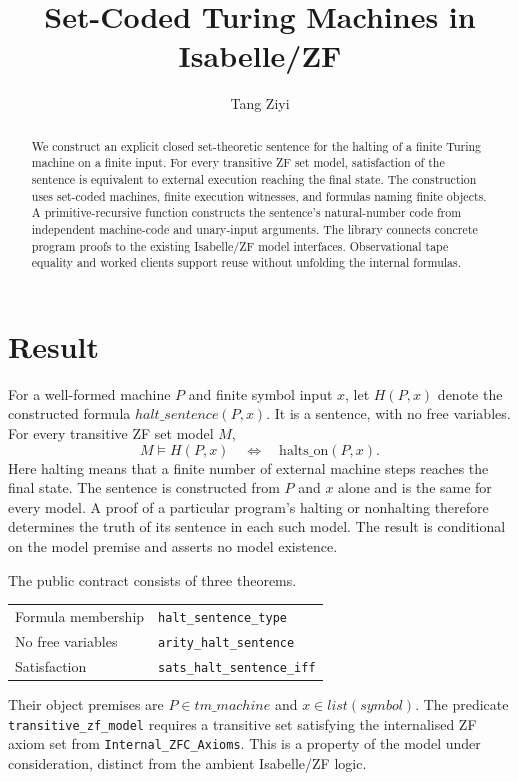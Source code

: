 \documentclass[11pt,a4paper]{article}
\newcommand{\theoremname}[1]{{\urlstyle{tt}\nolinkurl{#1}}}
\begin{document}
\title{Set-Coded Turing Machines in Isabelle/ZF}
\author{Tang Ziyi}
\maketitle

\begin{abstract}
We construct an explicit closed set-theoretic sentence for the halting of
a finite Turing machine on a finite input. For every transitive ZF set
model, satisfaction of the sentence is equivalent to external execution
reaching the final state. The construction uses set-coded machines,
finite execution witnesses, and formulas naming finite objects.
A primitive-recursive function constructs the sentence's natural-number
code from independent machine-code and unary-input arguments.
The library connects concrete program proofs to the existing Isabelle/ZF
model interfaces. Observational tape equality and worked clients support
reuse without unfolding the internal formulas.
\end{abstract}

\tableofcontents
\clearpage
{}

\section{Result}
For a well-formed machine $P$ and finite symbol input $x$, let
$H(P,x)$ denote the constructed formula
$\mathit{halt\_sentence}(P,x)$. It is a sentence, with no free variables.
For every transitive ZF set model $M$,
\[
  M\models H(P,x)
  \quad\Longleftrightarrow\quad
  \mathrm{halts\_on}(P,x).
\]
Here halting means that a finite number of external machine steps
reaches the final state. The sentence is constructed from $P$ and $x$
alone and is the same for every model. A proof of a particular program's
halting or nonhalting therefore determines the truth of its sentence in
each such model. The result is conditional on the model premise and
asserts no model existence.

The public contract consists of three theorems.
\begin{center}
\begin{tabular}{@{}ll@{}}
Formula membership & \theoremname{halt_sentence_type} \\
No free variables & \theoremname{arity_halt_sentence} \\
Satisfaction & \theoremname{sats_halt_sentence_iff}
\end{tabular}
\end{center}
Their object premises are $P\in\mathit{tm\_machine}$ and
$x\in\mathit{list}(\mathit{symbol})$.
The predicate \theoremname{transitive_zf_model} requires a transitive set
satisfying the internalised ZF axiom set from
\theoremname{Internal_ZFC_Axioms}. This is a property of the model under
consideration, distinct from the ambient Isabelle/ZF logic.
\end{document}
